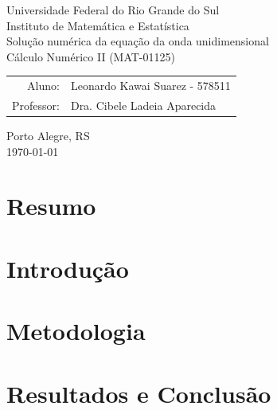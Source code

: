 \documentclass[11pt]{article}
\begin{document}
\nocite{*}

\begin{center}
    \large Universidade Federal do Rio Grande do Sul \\
    \large Instituto de Matemática e Estatística \\
    \vspace{4cm}
    \huge Solução numérica da equação da onda unidimensional \\
    \vspace{1cm}
    \Large Cálculo Numérico II (MAT-01125)  \\
    \vspace{4cm}

    \large\begin{tabular}{rl}
        Aluno: & Leonardo Kawai Suarez - 578511 \\
        Professor: & Dra. Cibele Ladeia Aparecida \\
    \end{tabular}

    \vfill
    \large Porto Alegre, RS \\
    \large \today
\end{center}

\newpage
\tableofcontents

\section{Resumo}


\section{Introdução}



\section{Metodologia}


\section{Resultados e Conclusão}


\printbibliography
\end{document}
